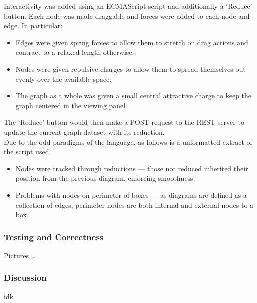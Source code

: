         Interactivity was added using an ECMAScript script and additionally a `Reduce' button.
        Each node was made draggable and forces were added to each node and edge.
        In particular:
        \begin{itemize}
            \item Edges were given spring forces to allow them to stretch on drag actions and contract to a relaxed length otherwise.
            \item Nodes were given repulsive charges to allow them to spread themselves out evenly over the available space.
            \item The graph as a whole was given a small central attractive charge to keep the graph centered in the viewing panel.
        \end{itemize}
        The `Reduce' button would then make a POST request to the REST server to update the current graph dataset with its reduction.\\

        Due to the odd paradigms of the language, as follows is a unformatted extract of the script used

        \begin{itemize}
            \item Nodes were tracked through reductions --- those not reduced inherited their position from the previous diagram, enforcing smoothness.
            \item Problems with nodes on perimeter of boxes --- as diagrams are defined as a collection  of edges, perimeter nodes are both internal and external nodes to a box.
        \end{itemize}


    \subsubsection{Testing and Correctness}
        Pictures~\ldots


    \subsubsection{Discussion}
        idk
